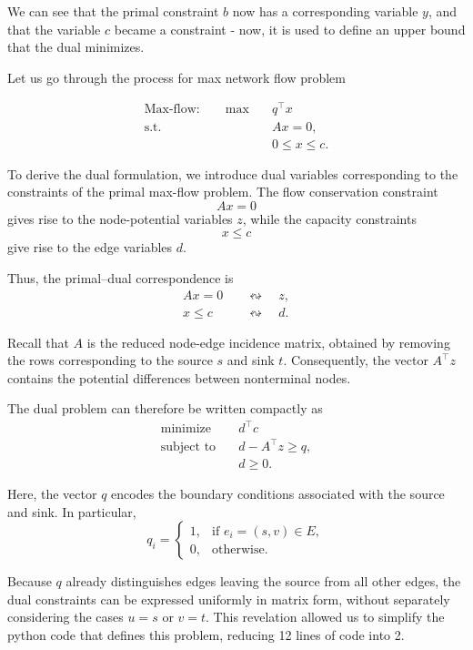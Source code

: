 \documentclass[12pt, openany]{article}
\begin{document}
We can see that the primal constraint \(b\) now has a corresponding variable \(y\), and that the variable \(c\) became a constraint - now, it is used to define an upper bound that the dual minimizes.

Let us go through the process for max network flow problem

\[
\begin{aligned}
\text{Max-flow:} \qquad
\max \quad & q^\top x \\
\text{s.t.} \quad
& Ax = 0, \\
& 0 \le x \le c .
\end{aligned}
\]

To derive the dual formulation, we introduce dual variables corresponding to the constraints of the primal max-flow problem. The flow conservation constraint
\[
Ax = 0
\]
gives rise to the node-potential variables \(z\), while the capacity constraints
\[
x \le c
\]
give rise to the edge variables \(d\).

Thus, the primal--dual correspondence is
\[
\begin{aligned}
Ax = 0
&\quad \leftrightsquigarrow \quad z, \\
x \le c
&\quad \leftrightsquigarrow \quad d .
\end{aligned}
\]

Recall that \(A\) is the reduced node-edge incidence matrix, obtained by removing the rows corresponding to the source \(s\) and sink \(t\). Consequently, the vector \(A^\top z\) contains the potential differences between nonterminal nodes.

The dual problem can therefore be written compactly as
\[
\begin{aligned}
\text{minimize} \quad & d^\top c \\
\text{subject to} \quad
& d - A^\top z \ge q, \\
& d \ge 0 .
\end{aligned}
\]

Here, the vector \(q\) encodes the boundary conditions associated with the source and sink. In particular,
\[
q_i =
\begin{cases}
1, & \text{if } e_i=(s,v)\in E, \\[2pt]
0, & \text{otherwise.}
\end{cases}
\]

Because \(q\) already distinguishes edges leaving the source from all other edges, the dual constraints can be expressed uniformly in matrix form, without separately considering the cases \(u=s\) or \(v=t\). This revelation allowed us to simplify the python code that defines this problem, reducing 12 lines of code into 2.
\end{document}
